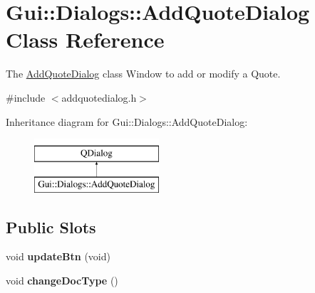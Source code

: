 \hypertarget{classGui_1_1Dialogs_1_1AddQuoteDialog}{}\section{Gui\+:\+:Dialogs\+:\+:Add\+Quote\+Dialog Class Reference}
\label{classGui_1_1Dialogs_1_1AddQuoteDialog}


The \hyperlink{classGui_1_1Dialogs_1_1AddQuoteDialog}{Add\+Quote\+Dialog} class Window to add or modify a Quote.  




{\ttfamily \#include $<$addquotedialog.\+h$>$}

Inheritance diagram for Gui\+:\+:Dialogs\+:\+:Add\+Quote\+Dialog\+:\begin{figure}[H]
\begin{center}
\leavevmode
\includegraphics[height=2.000000cm]{d6/d43/classGui_1_1Dialogs_1_1AddQuoteDialog}
\end{center}
\end{figure}
\subsection*{Public Slots}
\begin{DoxyCompactItemize}
\item 
\hypertarget{classGui_1_1Dialogs_1_1AddQuoteDialog_a5fa7b833c2a4271cc637e7dd9ec72fff}{}void {\bfseries update\+Btn} (void)\label{classGui_1_1Dialogs_1_1AddQuoteDialog_a5fa7b833c2a4271cc637e7dd9ec72fff}

\item 
\hypertarget{classGui_1_1Dialogs_1_1AddQuoteDialog_a43a4371f321d2690e73190354146e174}{}void {\bfseries change\+Doc\+Type} ()\label{classGui_1_1Dialogs_1_1AddQuoteDialog_a43a4371f321d2690e73190354146e174}

\end{DoxyCompactItemize}
